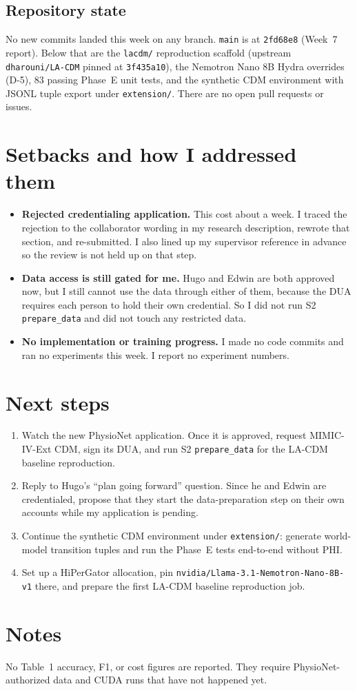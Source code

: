 \documentclass[11pt,letterpaper]{article}
\begin{document}
\subsection{Repository state}
No new commits landed this week on any branch. \texttt{main} is at \texttt{2fd68e8} (Week~7 report). Below that are the \texttt{lacdm/} reproduction scaffold (upstream \texttt{dharouni/LA-CDM} pinned at \texttt{3f435a10}), the Nemotron Nano 8B Hydra overrides (D-5), 83 passing Phase~E unit tests, and the synthetic CDM environment with JSONL tuple export under \texttt{extension/}. There are no open pull requests or issues.

\section{Setbacks and how I addressed them}
\begin{itemize}
  \item \textbf{Rejected credentialing application.} This cost about a week. I traced the rejection to the collaborator wording in my research description, rewrote that section, and re-submitted. I also lined up my supervisor reference in advance so the review is not held up on that step.
  \item \textbf{Data access is still gated for me.} Hugo and Edwin are both approved now, but I still cannot use the data through either of them, because the DUA requires each person to hold their own credential. So I did not run S2 \texttt{prepare\_data} and did not touch any restricted data.
  \item \textbf{No implementation or training progress.} I made no code commits and ran no experiments this week. I report no experiment numbers.
\end{itemize}

\section{Next steps}
\begin{enumerate}
  \item Watch the new PhysioNet application. Once it is approved, request MIMIC-IV-Ext CDM, sign its DUA, and run S2 \texttt{prepare\_data} for the LA-CDM baseline reproduction.
  \item Reply to Hugo's ``plan going forward'' question. Since he and Edwin are credentialed, propose that they start the data-preparation step on their own accounts while my application is pending.
  \item Continue the synthetic CDM environment under \texttt{extension/}: generate world-model transition tuples and run the Phase~E tests end-to-end without PHI.
  \item Set up a HiPerGator allocation, pin \texttt{nvidia/Llama-3.1-Nemotron-Nano-8B-v1} there, and prepare the first LA-CDM baseline reproduction job.
\end{enumerate}

\section*{Notes}
No Table~1 accuracy, F1, or cost figures are reported. They require PhysioNet-authorized data and CUDA runs that have not happened yet.
\end{document}
